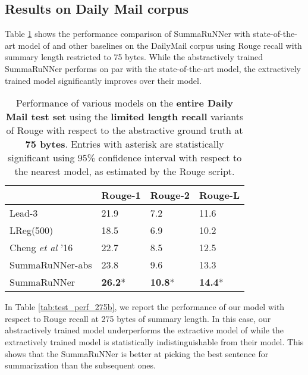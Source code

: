 \documentclass[letterpaper]{article}
\begin{document}
\subsection{Results on Daily Mail corpus}

Table \ref{tab:test_perf_75b} shows the performance comparison of SummaRuNNer with state-of-the-art model of \cite{jianpeng} and other baselines on the DailyMail corpus using Rouge recall with summary length restricted to 75 bytes. While the abstractively trained SummaRuNNer performs on par with the state-of-the-art model, the extractively trained model significantly improves over their model.



\begin{table}[ht]
\centering
\begin{tabular}{|l|l|l|l|}
\hline
 & Rouge-1 & Rouge-2 & Rouge-L \\
 \hline
Lead-3  & 21.9 & 7.2 & 11.6 \\
LReg(500) & 18.5 & 6.9 & 10.2 \\
Cheng {\it et al} '16 & 22.7 & 8.5 & 12.5 \\
SummaRuNNer-abs & 23.8 & 9.6 & 13.3 \\
SummaRuNNer &  {\bf 26.2}*  & {\bf 10.8}* & {\bf 14.4}* \\
\hline
\end{tabular}
\caption{{\small Performance of various models on the {\bf entire Daily Mail test set} using the {\bf limited length recall} variants of Rouge with respect to the abstractive ground truth at {\bf 75 bytes}.  Entries with asterisk are statistically significant using 95\% confidence interval with respect to the nearest model, as estimated by the Rouge script.}}
\label{tab:test_perf_75b}
\end{table}

In Table \ref{tab:test_perf_275b}, we report the performance of our model with respect to Rouge recall at 275 bytes of summary length. In this case, our abstractively trained model underperforms the extractive model  of \cite{jianpeng} while the extractively trained model is statistically indistinguishable from their model. This shows that the SummaRuNNer is better at picking the best sentence for summarization than the subsequent ones.
\end{document}
